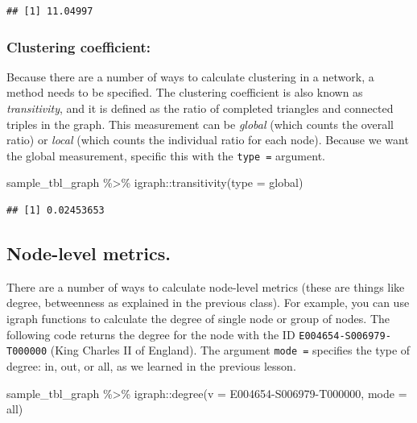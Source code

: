 \documentclass[
]{book}
\newenvironment{Shaded}{\begin{snugshade}}{\end{snugshade}}
\newcommand{\AttributeTok}[1]{\textcolor[rgb]{0.77,0.63,0.00}{#1}}
\newcommand{\FunctionTok}[1]{\textcolor[rgb]{0.00,0.00,0.00}{#1}}
\newcommand{\NormalTok}[1]{#1}
\newcommand{\SpecialCharTok}[1]{\textcolor[rgb]{0.00,0.00,0.00}{#1}}
\newcommand{\StringTok}[1]{\textcolor[rgb]{0.31,0.60,0.02}{#1}}
\begin{document}
\begin{verbatim}
## [1] 11.04997
\end{verbatim}

\hypertarget{clustering-coefficient-1}{%
\subsubsection{Clustering coefficient:}\label{clustering-coefficient-1}}

Because there are a number of ways to calculate clustering in a network, a method needs to be specified. The clustering coefficient is also known as \emph{transitivity}, and it is defined as the ratio of completed triangles and connected triples in the graph. This measurement can be \emph{global} (which counts the overall ratio) or \emph{local} (which counts the individual ratio for each node). Because we want the global measurement, specific this with the \texttt{type\ =} argument.

\begin{Shaded}
\begin{Highlighting}[]
\NormalTok{sample\_tbl\_graph }\SpecialCharTok{\%\textgreater{}\%}\NormalTok{ igraph}\SpecialCharTok{::}\FunctionTok{transitivity}\NormalTok{(}\AttributeTok{type =} \StringTok{\textquotesingle{}global\textquotesingle{}}\NormalTok{)}
\end{Highlighting}
\end{Shaded}

\begin{verbatim}
## [1] 0.02453653
\end{verbatim}

\hypertarget{node-level-metrics.}{%
\subsection{Node-level metrics.}\label{node-level-metrics.}}

There are a number of ways to calculate node-level metrics (these are things like degree, betweenness as explained in the previous class). For example, you can use igraph functions to calculate the degree of single node or group of nodes. The following code returns the degree for the node with the ID \texttt{E004654-S006979-T000000} (King Charles II of England). The argument \texttt{mode\ =} specifies the type of degree: in, out, or all, as we learned in the previous lesson.

\begin{Shaded}
\begin{Highlighting}[]
\NormalTok{sample\_tbl\_graph }\SpecialCharTok{\%\textgreater{}\%}\NormalTok{ igraph}\SpecialCharTok{::}\FunctionTok{degree}\NormalTok{(}\AttributeTok{v =} \StringTok{\textquotesingle{}E004654{-}S006979{-}T000000\textquotesingle{}}\NormalTok{, }\AttributeTok{mode =} \StringTok{\textquotesingle{}all\textquotesingle{}}\NormalTok{) }
\end{Highlighting}
\end{Shaded}
\end{document}
